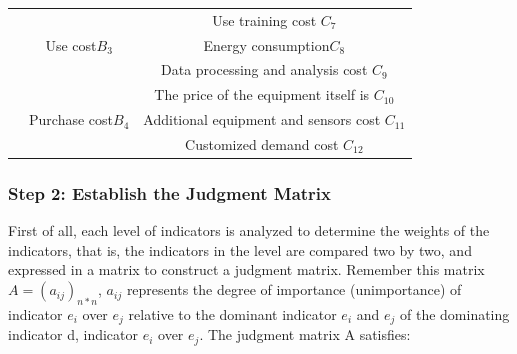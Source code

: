 \documentclass[12pt]{article}
\begin{document}
\begin{table}[h!]
{\begin{tabular}{@{}ccc@{}}
                                                                                                                                  & \multirow{3}{*}{Use cost$B_3$}                     & Use training cost $C_7$                      \\
                                                                                                                                  &                                                    & Energy consumption$C_8$                      \\
                                                                                                                                  &                                                    & Data processing and analysis cost $C_9$      \\ \cmidrule(l){2-3}
                                                                                                                                  & \multirow{3}{*}{Purchase cost$B_4$}                & The price of the equipment itself is $C_10$  \\
                                                                                                                                  &                                                    & Additional equipment and sensors cost $C_11$ \\
                                                                                                                                  &                                                    & Customized demand cost $C_12$                \\ \bottomrule
        \end{tabular}
    }
\end{table}


\subsubsection*{Step 2: Establish the Judgment Matrix}

First of all, each level of indicators is analyzed to determine the weights of the indicators, that is, the indicators in the level are compared two by two, and expressed in a matrix to construct a judgment matrix. Remember this matrix $A=\left(a_{ij}\right)_{n*n}$, $a_{ij}$ represents the degree of importance (unimportance) of indicator $e_{i}$ over $e_{j}$ relative to the dominant indicator $e_{i}$ and $e_{j}$ of the dominating indicator d, indicator $e_{i}$ over $e_{j}$. The judgment matrix A satisfies:
\end{document}
